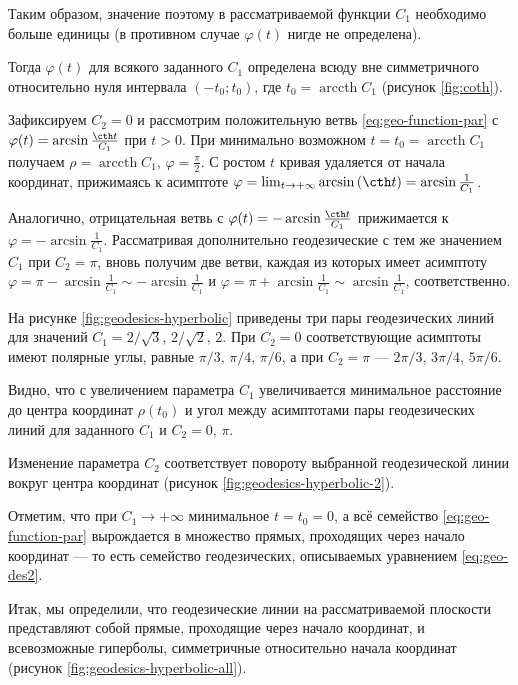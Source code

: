 \documentclass{article}
\numberwithin{equation}{section}
\renewcommand{\phi}{\varphi}
\DeclareMathOperator{\arccth}{arccth}
\begin{document}
Таким образом, значение поэтому в рассматриваемой функции $C_1$
необходимо больше единицы (в противном случае $\phi(t)$ нигде не
определена).

Тогда $\phi(t)$ для всякого заданного $C_1$ определена всюду вне
симметричного относительно нуля интервала $(-t_0;t_0)$, где $t_0 =
\arccth{C_1}$ (рисунок \ref{fig:coth}).

Зафиксируем $C_2 = 0$ и рассмотрим положительную ветвь
\eqref{eq:geo-function-par} с $\phi(t) = \arcsin\frac{\cth
    t}{C_1}$ при $t>0$. При минимально возможном $t = t_0 =
\arccth{C_1}$ получаем $\rho = \arccth{C_1}$, $\phi = \frac{\pi}{2}$. С ростом
$t$ кривая удаляется от начала координат, прижимаясь к асимптоте
$\phi = \lim_{t \to +\infty} \arcsin{\left(\cth t\right)} = \arcsin{\frac{1}{C_1}}$.

Аналогично, отрицательная ветвь с $\phi(t) = -\arcsin\frac{\cth t}{C_1}$
прижимается к $\phi = -\arcsin{\frac{1}{C_1}}$. Рассматривая
дополнительно геодезические с тем же значением $C_1$ при $C_2 = \pi$,
вновь получим две ветви, каждая из которых имеет асимптоту $\phi =
\pi-\arcsin\frac{1}{C_1} \sim -\arcsin\frac{1}{C_1}$ и $\phi =
\pi+\arcsin\frac{1}{C_1} \sim \arcsin\frac{1}{C_1}$, соответственно.



На рисунке \ref{fig:geodesics-hyperbolic} приведены три пары
геодезических линий для значений $C_1=2/\sqrt{3},\,2/\sqrt{2},\,2$.
При $C_2=0$ соответствующие асимптоты имеют полярные углы, равные
$\pi/3,\,\pi/4,\,\pi/6$, а при $C_2=\pi$ — $2\pi/3,\,3\pi/4,\,5\pi/6$.

Видно, что с увеличением параметра $C_1$ увеличивается минимальное
расстояние до центра координат $\rho(t_0)$ и угол между асимптотами
пары геодезических линий для заданного $C_1$ и $C_2=0,\,\pi$.

Изменение параметра $C_2$ соответствует повороту выбранной
геодезической линии вокруг центра координат (рисунок
\ref{fig:geodesics-hyperbolic-2}).



Отметим, что при $C_1 \to +\infty$ минимальное $t= t_0 = 0$, а всё
семейство \eqref{eq:geo-function-par} вырождается в множество прямых,
проходящих через начало координат — то есть семейство геодезических,
описываемых уравнением \eqref{eq:geo-des2}.



Итак, мы определили, что геодезические линии на рассматриваемой
плоскости представляют собой прямые, проходящие через начало
координат, и всевозможные гиперболы, симметричные относительно начала
координат (рисунок \ref{fig:geodesics-hyperbolic-all}).
\end{document}
